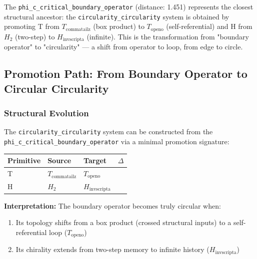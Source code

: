 \documentclass[12pt,a4paper]{article}
\begin{document}
The \texttt{phi\_c\_critical\_boundary\_operator} (distance: 1.451) represents the closest structural ancestor: the \texttt{circularity\_circularity} system is obtained by promoting T from $T_{\text{commatailz}}$ (box product) to $T_{\text{openo}}$ (self-referential) and H from $H_2$ (two-step) to $H_{\text{invscripta}}$ (infinite). This is the transformation from "boundary operator" to "circularity" --- a shift from operator to loop, from edge to circle.

\subsection{Promotion Path: From Boundary Operator to Circular Circularity}

\subsubsection{Structural Evolution}

The \texttt{circularity\_circularity} system can be constructed from the \texttt{phi\_c\_critical\_boundary\_operator} via a minimal promotion signature:

\begin{table}[htbp]
\centering
\small
{}
\begin{tabularx}{\textwidth}{>{\centering\arraybackslash}X >{\centering\arraybackslash}X >{\centering\arraybackslash}X >{\centering\arraybackslash}X}
\toprule
\rowcolor{gray!25}\textbf{Primitive} & \textbf{Source} & \textbf{Target} & \textbf{$\Delta$} \\
\midrule
\rowcolors{1}{white}{gray!10}
T & $T_{\text{commatailz}}$ & $T_{\text{openo}}$ & 1 \\
H & $H_2$ & $H_{\text{invscripta}}$ & 1 \\
\bottomrule
\end{tabularx}
\end{table}

\textbf{Interpretation:} The boundary operator becomes truly circular when:

\begin{enumerate}
    \item Its topology shifts from a box product (crossed structural inputs) to a self-referential loop ($T_{\text{openo}}$)
    \item Its chirality extends from two-step memory to infinite history ($H_{\text{invscripta}}$)
\end{enumerate}
\end{document}
